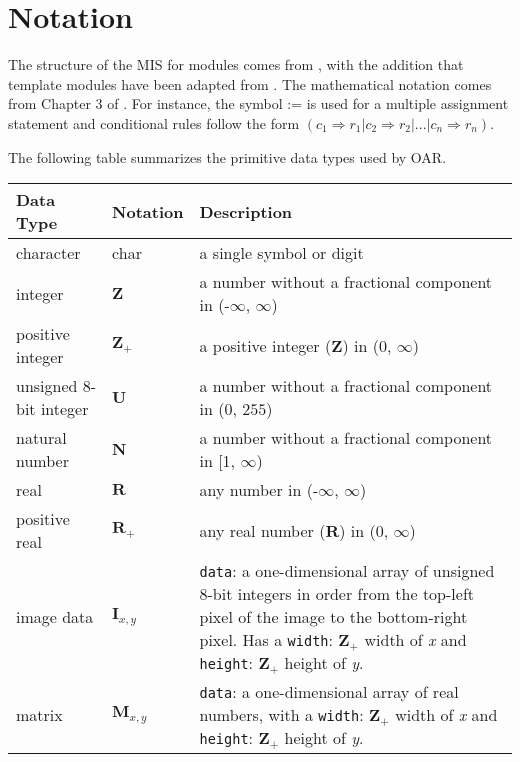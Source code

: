 \documentclass[12pt, titlepage]{article}
\def\code#1{\texttt{#1}}
\begin{document}
\section{Notation}

The structure of the MIS for modules comes from \citet{HoffmanAndStrooper1995},
with the addition that template modules have been adapted from
\cite{GhezziEtAl2003}.  The mathematical notation comes from Chapter 3 of
\citet{HoffmanAndStrooper1995}.  For instance, the symbol := is used for a
multiple assignment statement and conditional rules follow the form $(c_1
\Rightarrow r_1 | c_2 \Rightarrow r_2 | ... | c_n \Rightarrow r_n )$.

The following table summarizes the primitive data types used by OAR. 

\begin{center}
\renewcommand{\arraystretch}{1.2}
\noindent 
\begin{tabular}{l l p{7.5cm}} 
\toprule 
\textbf{Data Type} & \textbf{Notation} & \textbf{Description}\\ 
\midrule
character & char & a single symbol or digit\\
integer & $\mathbf{Z}$ & a number without a fractional component in (-$\infty$, $\infty$) \\
positive integer & $\mathbf{Z}_{+}$ & a positive integer ($\mathbf{Z}$) in ($0$, $\infty$) \\
unsigned 8-bit integer & $\mathbf{U}$ & a number without a fractional component in ($0$, $255$) \\
natural number & $\mathbf{N}$ & a number without a fractional component in [1, $\infty$) \\
real & $\mathbf{R}$ & any number in (-$\infty$, $\infty$)\\
positive real & $\mathbf{R}_{+}$ & any real number ($\mathbf{R}$) in ($0$, $\infty$) \\
image data & $\mathbf{I}_{x,y}$ & \code{data}: a one-dimensional array of unsigned 8-bit integers in order from the 
top-left pixel of the image to the bottom-right pixel. Has a \code{width}: $\mathbf{Z}_{+}$ width of \textit{x} and 
\code{height}: $\mathbf{Z}_{+}$ height of \textit{y}.\\
matrix & $\mathbf{M}_{x,y}$ & \code{data}: a one-dimensional array of real numbers, with a 
\code{width}: $\mathbf{Z}_{+}$ width of \textit{x} and \code{height}: $\mathbf{Z}_{+}$ height of \textit{y}.\\
\bottomrule
\end{tabular} 
\end{center}
\end{document}
